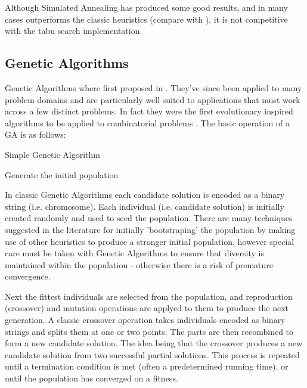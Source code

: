 Although Simulated Annealing has produced some good results, and in many cases outperforms the classic heuristics (compare \cite{Laporte:1999} with \cite{GLP:1999}), it is not competitive with the tabu search implementation. 

\subsection{Genetic Algorithms}

Genetic Algorithms where first proposed in \cite{Holland:1975}. They've since been applied to many problem domains and are particularly well suited to applications that must work across a few distinct problems. In fact they were the first evolutionary inspired algorithms to be applied to combinatorial problems \cite{Potvin:2009}. The basic operation of a GA is as follows:

\begin{algorithm}[H]
   \caption{Simple Genetic Algorithm}
   Generate the initial population\\
\end{algorithm}

In classic Genetic Algorithms each candidate solution is encoded as a binary string (i.e. chromosome). Each individual (i.e. candidate solution) is initially created randomly and used to seed the population. There are many techniques suggested in the literature for initially 'bootstraping' the population by making use of other heuristics to produce a stronger initial population, however special care must be taken with Genetic Algorithms to ensure that diversity is maintained within the population - otherwise there is a risk of premature convergence. 

Next the fittest individuals are selected from the population, and reproduction (crossover) and mutation operations are applyed to them to produce the next generation. A classic crossover operation takes individuals encoded as binary strings and splits them at one or two points. The parts are then recombined to form a new candidate solution. The idea being that the crossover produces a new candidate solution from two successful partial solutions. This process is repeated until a termination condition is met (often a predetermined running time), or until the population has converged on a fitness.


